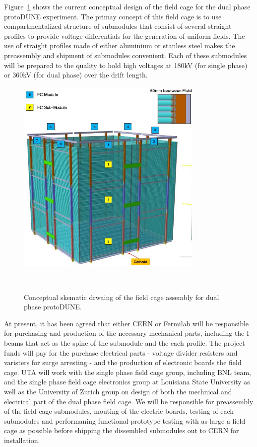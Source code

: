 Figure~\ref{fig:if-dp-fc} shows the current conceptual design of the field cage for the dual phase protoDUNE experiment.   The primay concept of this field cage is to use compartmentalized structure of submodules that consist of several straight profiles to provide voltage differentials for the generation of uniform fields.   The use of straight profiles made of either aluminium or stanless steel makes the preassembly and shipment of submodules convenient.   Each of these submodules will be prepared to the quality to hold high voltages at 180kV (for single phase) or  360kV (for dual phase) over the drift length.  
\begin{figure}[htb]
\centering
\includegraphics[width=0.80\textwidth]{images/if-dp-fc.jpg}
\caption[]{Conceptual skematic drwaing of the field cage assembly for dual phase protoDUNE.}
~\label{fig:if-dp-fc}
\end{figure}

At present, it has been agreed that either CERN or Fermilab will be responsible for purchasing and production of the necessary mechanical parts, including the I--beams that act as the spine of the submodule and the each profile.  The project funds will pay for the purchase electrical parts - voltage divider resisters and varisters for surge arresting - and the production of electronic boards the field cage.  UTA will work with the single phase field cage group, including BNL team, and the single phase field cage electronics group at Louisiana State University as well as the University of Zurich group on design of both the mechnical and electrical part of the dual phase field cage.   We will be responsible for preassembly of the field cage submodules, mouting of the electric boards, testing of each submodules and performaning functional prototype testing with as large a field cage as possible before shipping the dissembled submodules out to CERN for installation.

